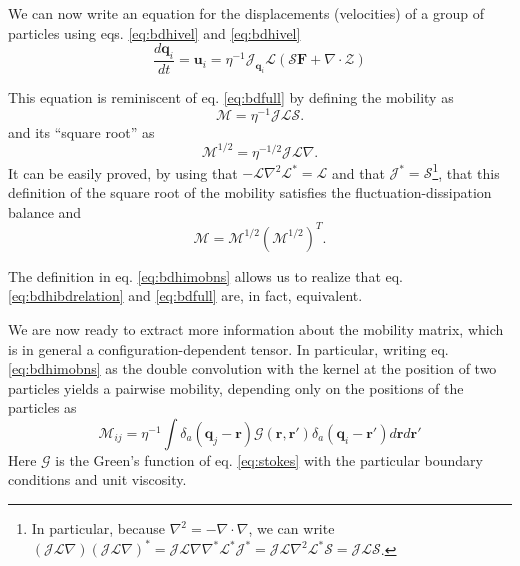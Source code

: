 \documentclass[ twoside,openright,titlepage,numbers=noenddot,%
headinclude,footinclude,cleardoublepage=empty,abstract=on,
BCOR=5mm,paper=a4,fontsize=11pt, dvipsnames
]{scrreprt}
\renewcommand{\vec}[1]{\bm{#1}}
\newcommand{\tens}[1]{\bm{\mathcal{#1}}}
\newcommand{\oper}[1]{\mathcal{#1}}
\newcommand{\kT}{k_B T}
\newcommand{\ppos}{q}
\begin{document}
We can now write an equation for the displacements (velocities) of a group of particles using eqs. \eqref{eq:bdhivel} and \eqref{eq:bdhivel}
\begin{equation}
  \label{eq:bdhibdrelation}
  \frac{d\vec{q}_i}{dt} = \vec{u}_i = \eta^{-1}\oper{J}_{\vec{\ppos}_i}\oper{L}(\oper{S}\vec{F} + \nabla\cdot\mathcal Z)
\end{equation}

This equation is reminiscent of eq. \eqref{eq:bdfull} by defining the mobility as
\begin{equation}
  \label{eq:bdhimobns}
  \tens{M} = \eta^{-1}\oper{J}\oper{L}\oper{S}.
\end{equation}
and its ``square root'' as
\begin{equation}
  \tens{M}^{1/2} = \eta^{-1/2}\oper{J}\oper{L}\nabla.
\end{equation}
It can be easily proved, by using that $-\oper{L}\nabla^2\oper{L}^* = \oper{L}$ and that $\oper{J}^*=\oper{S}$\cite{Delong2014}\footnote{In particular, because $\nabla^2 = -\nabla\cdot\nabla$, we can write $\left(\oper{J}\oper{L}\nabla\right)\left(\oper{J}\oper{L}\nabla\right)^* = \oper{J}\oper{L}\nabla\nabla^*\oper{L}^*\oper{J}^* = \oper{J}\oper{L}\nabla^2\oper{L}^*\oper{S} = \oper{J}\oper{L}\oper{S}$.}, that this definition of the square root of the mobility satisfies the fluctuation-dissipation balance and
\begin{equation}
  \label{eq:mobsqrt}
  \tens{M} = \tens{M}^{1/2}\left(\tens{M}^{1/2}\right)^T.
\end{equation}

The definition in eq. \ref{eq:bdhimobns} allows us to realize that eq. \eqref{eq:bdhibdrelation} and \eqref{eq:bdfull} are, in fact, equivalent.

We are now ready to extract more information about the mobility matrix, which is in general a configuration-dependent tensor. In particular, writing eq. \eqref{eq:bdhimobns} as the double convolution with the kernel at the position of two particles yields a pairwise mobility, depending only on the positions of the particles as
\begin{equation}
  \label{eq:bdhimob}
  \tens{M}_{ij} = \eta^{-1}\int{\delta_a(\vec{q}_j-\vec{r})\tens{G}(\vec{r}, \vec{r}')\delta_a(\vec{q}_i -\vec{r}')d\vec{r}d\vec{r}'}
\end{equation}
Here $\tens{G}$ is the Green's function of eq. \eqref{eq:stokes} with the particular boundary conditions and unit viscosity.
\end{document}
